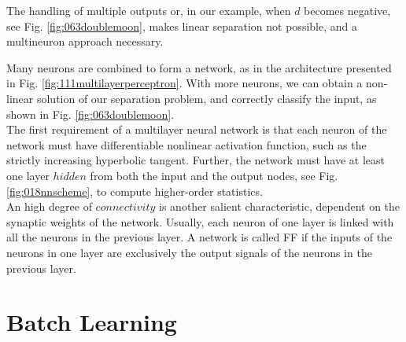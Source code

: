 The handling of multiple outputs or, in our example, 
when $d$ becomes negative, see Fig. \ref{fig:063doublemoon}, makes linear
separation not possible, and a multineuron approach necessary. 

Many neurons are combined to form a network, as in the architecture presented
in Fig. \ref{fig:111multilayerperceptron}.
With more neurons, we can obtain a non-linear solution of our separation
problem, and correctly classify the input, as shown in Fig.
\ref{fig:063doublemoon}.\\
The first requirement of a multilayer neural network is that each neuron 
of the network must have differentiable nonlinear activation
function, such as the strictly increasing hyperbolic tangent.
Further, the network must have at least one layer $hidden$ from both the input
and the output nodes, see Fig. \ref{fig:018nnscheme}, to compute higher-order
statistics.\\
An high degree of $connectivity$ is another salient characteristic, dependent on
the synaptic weights of the network.
Usually, each neuron of one layer is linked with all the neurons in the previous
layer.
A network is called \acs{FF} if the inputs of the neurons in
one layer are exclusively the output signals of the neurons in the previous
layer.\\


\section{Batch Learning}
\label{sec:batchlearning}

